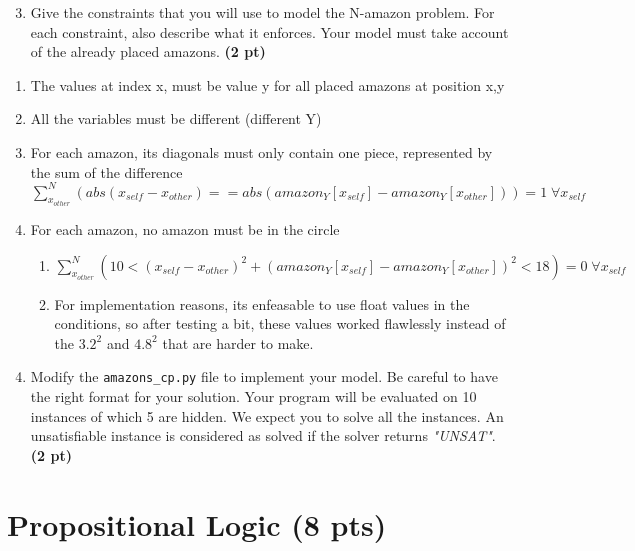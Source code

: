 \documentclass[11pt,a4paper]{report}
\begin{document}
\begin{enumerate}
	\setcounter{enumi}{2}
	\item  Give the constraints that you will use to model the N-amazon problem.
	For each constraint, also describe what it enforces.
	Your model must take account of the already placed amazons. \textbf{(2 pt)}

\end{enumerate}

\begin{answers}[10cm]
\begin{enumerate}
    \item The values at index x, must be value y for all placed amazons at position x,y
    \item All the variables must be different (different Y)
    \item For each amazon, its diagonals must only contain one piece, represented by the sum of the difference $\sum_{x_{other}}^N(abs(x_{self} - x_{other}) == abs(amazon_Y[x_{self}] - amazon_Y[x_{other}])) = 1\; \forall x_{self}$
    \item For each amazon, no amazon must be in the circle
    \begin{enumerate}
        \item $\sum_{x_{other}}^N(10 < (x_{self} - x_{other})^2 + (amazon_Y[x_{self}] - amazon_Y[x_{other}])^2 < 18) = 0\; \forall x_{self}$
        \item For implementation reasons, its enfeasable to use float values in the conditions, so after testing a bit, these values worked flawlessly instead of the $3.2^2$ and $4.8^2$ that are harder to make.
    \end{enumerate}
\end{enumerate}
\end{answers}

\begin{enumerate}
	\setcounter{enumi}{3}
	\item Modify the \texttt{amazons\_cp.py} file to implement your model.
	Be careful to have the right format for your solution. 
	Your program will be evaluated on 10 instances of which 5 are hidden. 
	We expect you to solve all the instances.
	An unsatisfiable instance is considered as solved if the solver returns \textit{"UNSAT"}. \textbf{(2 pt)}
\end{enumerate}

\section{Propositional Logic (8 pts)}
\end{document}
